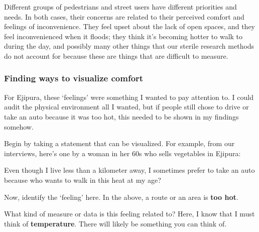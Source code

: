 \documentclass[
]{latex/krantz}
\renewenvironment{quote}{\begin{VF}}{\end{VF}}
\begin{document}
Different groups of pedestrians and street users have different priorities and needs. In both cases, their concerns are related to their perceived comfort and feelings of inconvenience. They feel upset about the lack of open spaces, and they feel inconvenienced when it floods; they think it's becoming hotter to walk to during the day, and possibly many other things that our sterile research methods do not account for because these are things that are difficult to measure.

\hypertarget{finding-ways-to-visualize-comfort}{%
\subsubsection{Finding ways to visualize comfort}\label{finding-ways-to-visualize-comfort}}

For Ejipura, these `feelings' were something I wanted to pay attention to. I could audit the physical environment all I wanted, but if people still chose to drive or take an auto because it was too hot, this needed to be shown in my findings somehow.

Begin by taking a statement that can be visualized. For example, from our interviews, here's one by a woman in her 60s who sells vegetables in Ejipura:

\begin{quote}
Even though I live less than a kilometer away, I sometimes prefer to take an auto because who wants to walk in this heat at my age?
\end{quote}

Now, identify the `feeling' here. In the above, a route or an area is \textbf{too hot}.

What kind of measure or data is this feeling related to? Here, I know that I must think of \textbf{temperature}. There will likely be something you can think of.
\end{document}
